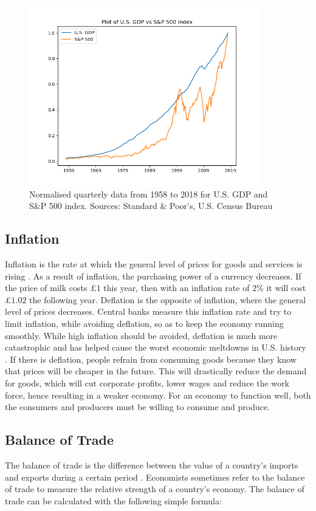 \documentclass{UoYCSproject}
\begin{document}
\begin{figure}[h]
\includegraphics[width=10cm]{GDPvsSP500}
\centering
\caption{Normalised quarterly data from 1958 to 2018 for U.S. GDP and S\&P 500 index. Sources: Standard \& Poor's, U.S. Census Bureau} 
\label{fig:gdpvssp500}
\end{figure}

\subsection{Inflation}
Inflation is the rate at which the general level of prices for goods and services is rising \cite{inflation}. As a result of inflation, the purchasing power of a currency decreases. If the price of milk costs \pounds $1$ this year, then with an inflation rate of $2$\% it will cost \pounds $1.02$ the following year. Deflation is the opposite of inflation, where the general level of prices decreases. Central banks measure this inflation rate and try to limit inflation, while avoiding deflation, so as to keep the economy running smoothly. While high inflation should be avoided, deflation is much more catastrophic and has helped cause the worst economic meltdowns in U.S. history \cite{fleckenstein2013deflation}. If there is deflation, people refrain from consuming goods because they know that prices will be cheaper in the future. This will drastically reduce the demand for goods, which will cut corporate profits, lower wages and reduce the work force, hence resulting in a weaker economy. For an economy to function well, both the consumers and producers must be willing to consume and produce. 

\subsection{Balance of Trade}
The balance of trade is the difference between the value of a country's imports and exports during a certain period \cite{balanceoftrade}. Economists sometimes refer to the balance of trade to measure the relative strength of a country's economy. The balance of trade can be calculated with the following simple formula:
\end{document}
